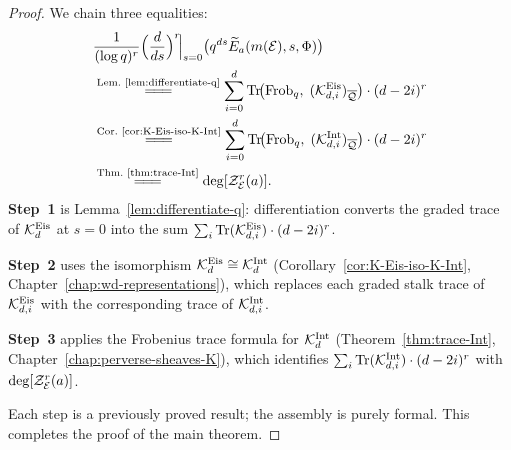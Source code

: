 \begin{proof}
  We chain three equalities:
  \begin{align*}
    &\frac{1}{(\log q)^r}
    \Bigl(\frac{d}{ds}\Bigr)^r\!\Big|_{s=0}
    \bigl(q^{ds}\widetilde{E}_a(m(\cE),s,\Phi)\bigr) \\
    &\overset{\text{Lem.~\ref{lem:differentiate-q}}}{=\!=\!=}
    \sum_{i=0}^d
    \Tr\!\bigl(\Frob_q,\; (\cK^{\mathrm{Eis}}_{d,i})_{\overline{\cQ}}\bigr)\cdot
    (d-2i)^r \\
    &\overset{\text{Cor.~\ref{cor:K-Eis-iso-K-Int}}}{=\!=\!=}
    \sum_{i=0}^d
    \Tr\!\bigl(\Frob_q,\; (\cK^{\mathrm{Int}}_{d,i})_{\overline{\cQ}}\bigr)\cdot
    (d-2i)^r \\
    &\overset{\text{Thm.~\ref{thm:trace-Int}}}{=\!=\!=}
    \deg[\cZ_{\cE}^r(a)].
  \end{align*}
  \textbf{Step~1} is Lemma~\ref{lem:differentiate-q}: differentiation converts the
  graded trace of \(\mathcal{K}_d^{\mathrm{Eis}}\) at \(s = 0\) into the sum
  \(\sum_i \operatorname{Tr}(\mathcal{K}^{\mathrm{Eis}}_{d,i}) \cdot (d-2i)^r\).

  \textbf{Step~2} uses the isomorphism \(\mathcal{K}_d^{\mathrm{Eis}} \cong \mathcal{K}_d^{\mathrm{Int}}\)
  (Corollary~\ref{cor:K-Eis-iso-K-Int}, Chapter~\ref{chap:wd-representations}), which
  replaces each graded stalk trace of \(\mathcal{K}^{\mathrm{Eis}}_{d,i}\) with the corresponding
  trace of \(\mathcal{K}^{\mathrm{Int}}_{d,i}\).

  \textbf{Step~3} applies the Frobenius trace formula for \(\mathcal{K}_d^{\mathrm{Int}}\)
  (Theorem~\ref{thm:trace-Int}, Chapter~\ref{chap:perverse-sheaves-K}), which identifies
  \(\sum_i \operatorname{Tr}(\mathcal{K}^{\mathrm{Int}}_{d,i}) \cdot (d-2i)^r\) with \(\deg[\mathcal{Z}_{\mathcal{E}}^r(a)]\).

  Each step is a previously proved result; the assembly is purely formal. This completes
  the proof of the main theorem.
\end{proof}
